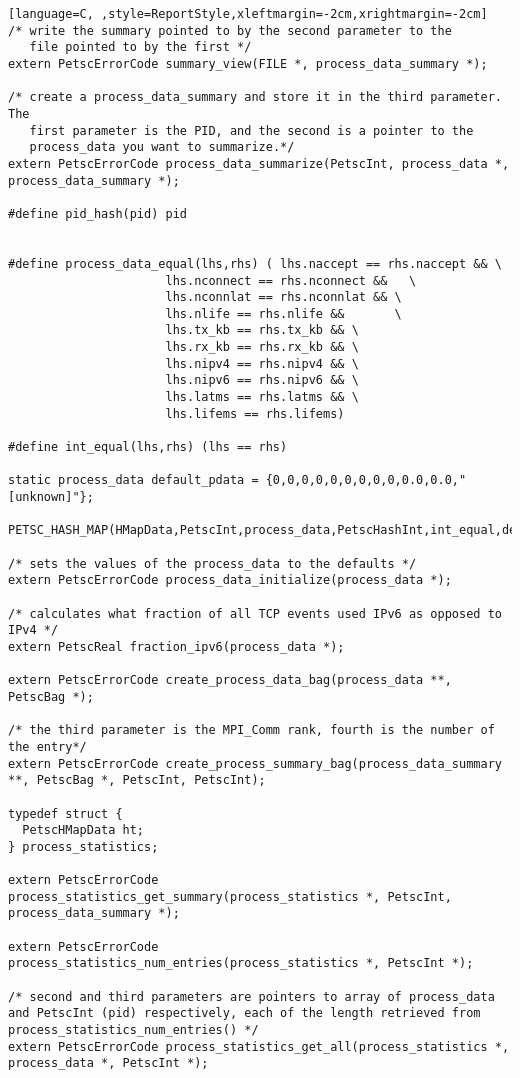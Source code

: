 \documentclass[11pt]{article}
\begin{document}
\begin{lstlisting}[language=C, ,style=ReportStyle,xleftmargin=-2cm,xrightmargin=-2cm]
/* write the summary pointed to by the second parameter to the
   file pointed to by the first */
extern PetscErrorCode summary_view(FILE *, process_data_summary *);

/* create a process_data_summary and store it in the third parameter. The
   first parameter is the PID, and the second is a pointer to the 
   process_data you want to summarize.*/
extern PetscErrorCode process_data_summarize(PetscInt, process_data *, process_data_summary *);

#define pid_hash(pid) pid


#define process_data_equal(lhs,rhs) ( lhs.naccept == rhs.naccept && \
				      lhs.nconnect == rhs.nconnect &&	\
				      lhs.nconnlat == rhs.nconnlat && \
				      lhs.nlife == rhs.nlife &&	      \
				      lhs.tx_kb == rhs.tx_kb && \
				      lhs.rx_kb == rhs.rx_kb &&	\
				      lhs.nipv4 == rhs.nipv4 && \
				      lhs.nipv6 == rhs.nipv6 && \
				      lhs.latms == rhs.latms && \
				      lhs.lifems == rhs.lifems)

#define int_equal(lhs,rhs) (lhs == rhs)

static process_data default_pdata = {0,0,0,0,0,0,0,0,0,0.0,0.0,"[unknown]"};

PETSC_HASH_MAP(HMapData,PetscInt,process_data,PetscHashInt,int_equal,default_pdata);

/* sets the values of the process_data to the defaults */
extern PetscErrorCode process_data_initialize(process_data *);

/* calculates what fraction of all TCP events used IPv6 as opposed to IPv4 */
extern PetscReal fraction_ipv6(process_data *);

extern PetscErrorCode create_process_data_bag(process_data **, PetscBag *);

/* the third parameter is the MPI_Comm rank, fourth is the number of the entry*/
extern PetscErrorCode create_process_summary_bag(process_data_summary **, PetscBag *, PetscInt, PetscInt);

typedef struct {
  PetscHMapData ht;
} process_statistics;

extern PetscErrorCode process_statistics_get_summary(process_statistics *, PetscInt, process_data_summary *);

extern PetscErrorCode process_statistics_num_entries(process_statistics *, PetscInt *);

/* second and third parameters are pointers to array of process_data and PetscInt (pid) respectively, each of the length retrieved from process_statistics_num_entries() */
extern PetscErrorCode process_statistics_get_all(process_statistics *, process_data *, PetscInt *);



\end{lstlisting}
\end{document}
